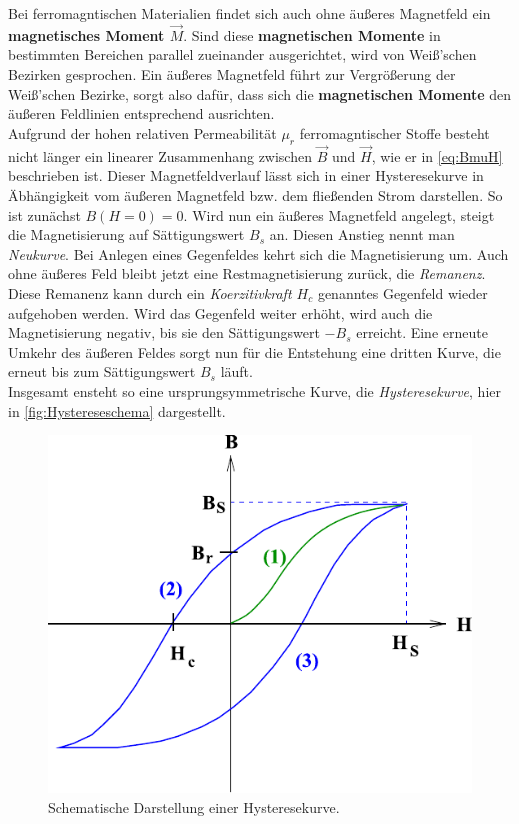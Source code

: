 Bei ferromagntischen Materialien findet sich auch ohne äußeres Magnetfeld ein \textbf{magnetisches Moment $\vec{M}$}. Sind diese \textbf{magnetischen Momente} in bestimmten Bereichen parallel zueinander ausgerichtet, wird
von Weiß'schen Bezirken gesprochen. Ein äußeres Magnetfeld führt zur Vergrößerung der Weiß'schen Bezirke, sorgt also dafür, dass sich die \textbf{magnetischen Momente} den äußeren Feldlinien entsprechend ausrichten.\\

Aufgrund der hohen relativen Permeabilität $μ_r$ ferromagntischer Stoffe besteht nicht länger ein linearer Zusammenhang zwischen $\vec{B}$ und $\vec{H}$, wie er in \eqref{eq:BmuH} beschrieben ist.
Dieser Magnetfeldverlauf lässt sich in einer Hysteresekurve in Äbhängigkeit vom äußeren Magnetfeld bzw. dem fließenden Strom darstellen. So ist zunächst $B(H=0)=0$. Wird nun ein äußeres Magnetfeld angelegt, steigt die Magnetisierung
auf Sättigungswert $B_s$ an. Diesen Anstieg nennt man \textit{Neukurve}. Bei Anlegen eines Gegenfeldes kehrt sich die Magnetisierung um. Auch ohne äußeres Feld bleibt jetzt eine Restmagnetisierung zurück, die \textit{Remanenz}.
Diese Remanenz kann durch ein \textit{Koerzitivkraft $H_c$} genanntes Gegenfeld wieder aufgehoben werden.
Wird das Gegenfeld weiter erhöht, wird auch die Magnetisierung negativ, bis sie den Sättigungswert $-B_s$ erreicht. Eine erneute Umkehr des äußeren Feldes sorgt nun für die Entstehung eine dritten Kurve,
die erneut bis zum Sättigungswert $B_s$ läuft.\\
 
Insgesamt ensteht so eine ursprungsymmetrische Kurve, die \textit{Hysteresekurve}, hier in \autoref{fig:Hystereseschema} dargestellt.

\begin{figure}[ht]
    \centering
    \includegraphics{Hystereseschema.pdf}
    \caption{Schematische Darstellung einer Hysteresekurve\cite{ap03}.}
    \label{fig:Hystereseschema}
  \end{figure}



